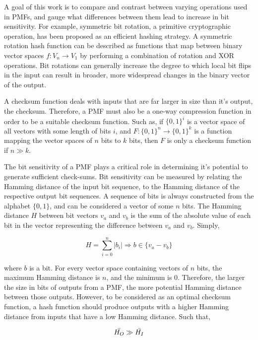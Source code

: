 \documentclass{article}
\begin{document}
A goal of this work is to compare and contrast between  varying operations used in PMFs, and gauge what differences between them lead to increase in bit sensitivity. For example, symmetric bit rotation, a primitive cryptographic operation, has been proposed as an efficient hashing strategy\citep{pieprzyk1999fast}. A symmetric rotation hash function can be described as functions that map between binary vector spaces $f : V_n \rightarrow V_1$ by performing a combination of rotation and XOR operations. Bit rotations can generally increase the degree to which local bit flips in the input can result in broader, more widespread changes in the binary vector of the output. 

A checksum function deals with inputs that are far larger in size than it's output, the checksum. Therefore, a PMF must also be a one-way compression function in order to be a suitable checksum function. Such as, if $\{0, 1\}^i$ is a vector space of all vectors with some length of bits $i$, and $F : \{0, 1\}^n \rightarrow \{0, 1\}^k$ is a function mapping the vector spaces of $n$ bits to $k$ bits, then $F$ is only a checksum function if $n \gg k$.

The bit sensitivity of a PMF plays a critical role in determining it's potential to generate sufficient check-sums. Bit sensitivity can be measured by relating the Hamming distance of the input bit sequence, to the Hamming distance\citep{bookstein2002generalizedhamm} of the respective output bit sequences. A sequence of bits is always constructed from the alphabet $\{0, 1\}$, and can be considered a vector of some $n$ bits. The Hamming distance $H$ between bit vectors $v_a$ and $v_b$  is the sum of the absolute value of each bit in the vector representing the difference between $v_a$ and $v_b$. Simply,

\begin{equation*}
    H = \sum^{n}_{i = 0} |b_i| \Rightarrow b \in \{ v_a - v_b  \}
\end{equation*}

where $b$ is a bit. For every vector space containing vectors of $n$ bits, the maximum Hamming distance is $n$, and the minimum is $0$. Therefore, the larger the size in bits of outputs from a PMF, the more potential Hamming distance between those outputs. However, to be considered as an optimal checksum function, a hash function should produce outputs with a higher Hamming distance from inputs that have a low Hamming distance. Such that, 

\begin{equation*}
    \Bar{H_O} \gg \Bar{H_I}
\end{equation*}
\end{document}
